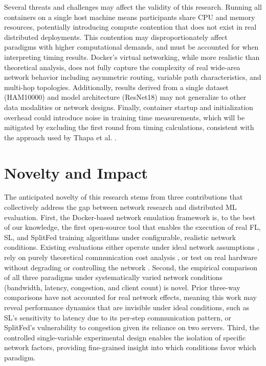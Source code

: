 \documentclass[12pt]{article}
\begin{document}
Several threats and challenges may affect the validity of this research. Running all containers on a single host machine means participants share CPU and memory resources, potentially introducing compute contention that does not exist in real distributed deployments. This contention may disproportionately affect paradigms with higher computational demands, and must be accounted for when interpreting timing results. Docker's virtual networking, while more realistic than theoretical analysis, does not fully capture the complexity of real wide-area network behavior including asymmetric routing, variable path characteristics, and multi-hop topologies. Additionally, results derived from a single dataset (HAM10000) and model architecture (ResNet18) may not generalize to other data modalities or network designs. Finally, container startup and initialization overhead could introduce noise in training time measurements, which will be mitigated by excluding the first round from timing calculations, consistent with the approach used by Thapa et al. \cite{thapa2022}.

\section{Novelty and Impact}

The anticipated novelty of this research stems from three contributions that collectively address the gap between network research and distributed ML evaluation. First, the Docker-based network emulation framework is, to the best of our knowledge, the first open-source tool that enables the execution of real FL, SL, and SplitFed training algorithms under configurable, realistic network conditions. Existing evaluations either operate under ideal network assumptions \cite{thapa2022}, rely on purely theoretical communication cost analysis \cite{singh2019}, or test on real hardware without degrading or controlling the network \cite{gao2020}. Second, the empirical comparison of all three paradigms under systematically varied network conditions (bandwidth, latency, congestion, and client count) is novel. Prior three-way comparisons have not accounted for real network effects, meaning this work may reveal performance dynamics that are invisible under ideal conditions, such as SL's sensitivity to latency due to its per-step communication pattern, or SplitFed's vulnerability to congestion given its reliance on two servers. Third, the controlled single-variable experimental design enables the isolation of specific network factors, providing fine-grained insight into which conditions favor which paradigm.
\end{document}
